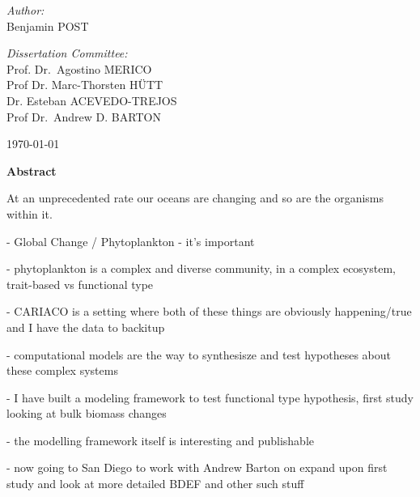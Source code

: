 \begin{titlepage}
\begin{center}
\vspace{2cm}
\begin{minipage}{0.4\textwidth}
\begin{flushleft} 
\emph{Author:}\\
Benjamin \MakeUppercase{Post}
\end{flushleft}
\end{minipage}
\begin{minipage}{0.4\textwidth}
\begin{flushright} 
\emph{Dissertation Committee:} \\
Prof. Dr.~Agostino \MakeUppercase{Merico}\\
Prof Dr. Marc-Thorsten \MakeUppercase{Hütt}\\
Dr. Esteban \MakeUppercase{Acevedo-Trejos}\\
Prof Dr.~Andrew D. \MakeUppercase{Barton}\\
\end{flushright}
\end{minipage}

\vspace{2cm}

{\today}

\end{center}


\large 
\textbf{Abstract} \\

\normalsize

At an unprecedented rate our oceans are changing and so are the organisms within it.

- Global Change / Phytoplankton - it's important

- phytoplankton is a complex and diverse community, in a complex ecosystem, trait-based vs functional type

- CARIACO is a setting where both of these things are obviously happening/true and I have the data to backitup

- computational models are the way to synthesisze and test hypotheses about these complex systems

- I have built a modeling framework to test functional type hypothesis, first study looking at bulk biomass changes

- the modelling framework itself is interesting and publishable

- now going to San Diego to work with Andrew Barton on expand upon first study and look at more detailed BDEF and other such stuff


\end{titlepage}

